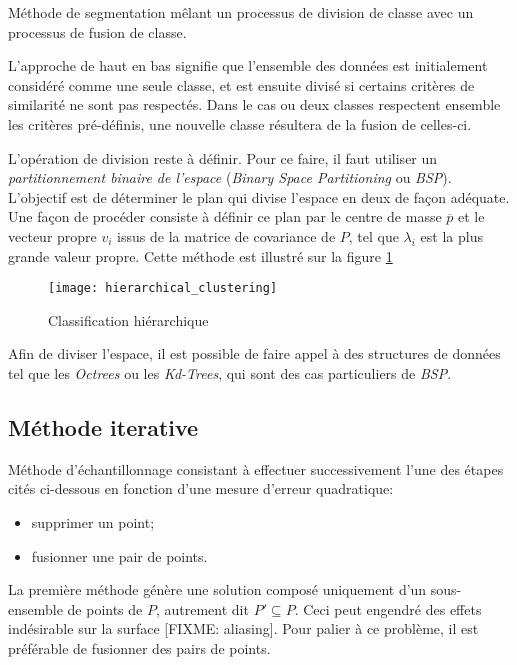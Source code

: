 \begin{definition}
  Méthode de segmentation mêlant un processus de division de classe avec un processus de fusion de classe.
\end{definition}

L'approche de haut en bas signifie que l'ensemble des données est initialement considéré comme une seule classe, et est ensuite divisé si certains critères de similarité ne sont pas respectés. Dans le cas ou deux classes respectent ensemble les critères pré-définis, une nouvelle classe résultera de la fusion de celles-ci.

L'opération de division reste à définir. Pour ce faire, il faut utiliser un \emph{partitionnement binaire de l'espace} (\emph{Binary Space Partitioning} ou \emph{BSP}). L'objectif est de déterminer le plan qui divise l'espace en deux de façon adéquate. Une façon de procéder consiste à définir ce plan par le centre de masse $\overline{p}$ et le vecteur propre $v_i$ issus de la matrice de covariance de $P$, tel que $\lambda_i$ est la plus grande valeur propre. Cette méthode est illustré sur la figure \ref{fig:sampling_hierarchical}

\begin{figure}
  \centering
  \texttt{[image: hierarchical\_clustering]}
  \caption{Classification hiérarchique~\cite{Pauly2002} \label{fig:sampling_hierarchical}}
\end{figure}

Afin de diviser l'espace, il est possible de faire appel à des structures de données tel que les \emph{Octrees} ou les \emph{Kd-Trees}, qui sont des cas particuliers de \emph{BSP}.

\subsection{Méthode iterative}
\begin{definition}
  Méthode d'échantillonnage consistant à effectuer successivement l'une des étapes cités ci-dessous en fonction d'une mesure d'erreur quadratique:
  \begin{itemize}
    \item supprimer un point;
    \item fusionner une pair de points.
  \end{itemize}
\end{definition}

La première méthode génère une solution composé uniquement d'un sous-ensemble de points de $P$, autrement dit $P' \subseteq P$. Ceci peut engendré des effets indésirable sur la surface [FIXME: aliasing]. Pour palier à ce problème, il est préférable de fusionner des pairs de points.

